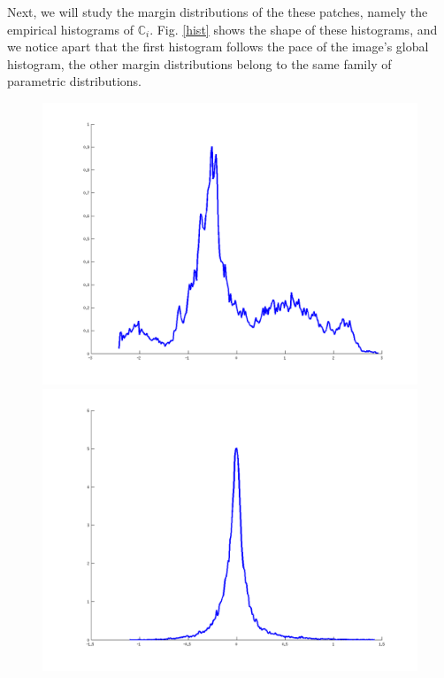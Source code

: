 \documentclass[runningheads]{llncs}
\newcommand{\rand}[1]{\ensuremath{\mathbb{#1}}}
\begin{document}
Next, we will study the margin distributions of the these patches, namely the empirical histograms of $\rand{C}_i$.
Fig. \ref{hist} shows the shape of these histograms, and we notice apart that the first histogram follows the pace of the image's global histogram, the other margin distributions belong to the same family of parametric distributions.  
  \begin{figure}[!h]
    \centering
    \begin{minipage}{0.3\linewidth}
    \includegraphics[width=\linewidth]{h_1}
    \end{minipage}
    \begin{minipage}{0.3\linewidth}
    \includegraphics[width=\linewidth]{h_2}
    \end{minipage}

\end{figure}
\end{document}
